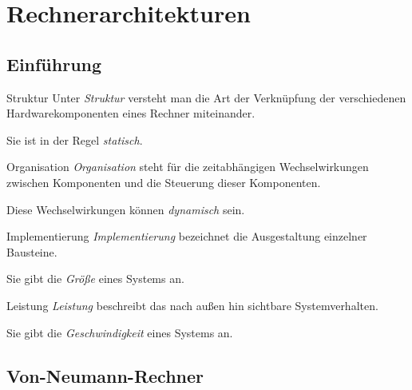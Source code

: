 \section{Rechnerarchitekturen}\label{sec:rechnerarchitekturen}

\subsection{Einführung}\label{subsec:einfuehrung}

\begin{defi}{Struktur}
    Unter \emph{Struktur} versteht man die Art der Verknüpfung der verschiedenen Hardwarekomponenten eines Rechner miteinander.
    
    Sie ist in der Regel \emph{statisch}.
\end{defi}

\begin{defi}{Organisation}
    \emph{Organisation} steht für die zeitabhängigen Wechselwirkungen zwischen Komponenten und die Steuerung dieser Komponenten.
    
    Diese Wechselwirkungen können \emph{dynamisch} sein.
\end{defi}

\begin{defi}{Implementierung}
    \emph{Implementierung} bezeichnet die Ausgestaltung einzelner Bausteine.
    
    Sie gibt die \emph{Größe} eines Systems an.
\end{defi}

\begin{defi}{Leistung}
    \emph{Leistung} beschreibt das nach außen hin sichtbare Systemverhalten.
    
    Sie gibt die \emph{Geschwindigkeit} eines Systems an.
\end{defi}

\subsection{Von-Neumann-Rechner}\label{subsec:von-neumann-rechner}


